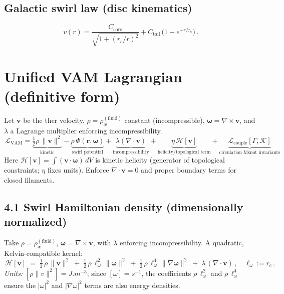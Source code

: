 \documentclass[11pt,a4paper]{article}
\newcommand{\aeether}{\text{\ae}} %
\begin{document}
    \subsection{Galactic swirl law (disc kinematics)}
    \[
        \boxed{\, v(r) = \frac{C_{\mathrm{core}}}{\sqrt{1 + (r_c/r)^2}} + C_{\mathrm{tail}}\,\big(1 - e^{-r/r_c}\big) \,}.
    \]

    \section{Unified VAM Lagrangian (definitive form)}
    Let $\bm v$ be the \aeether{}ther velocity, $\rho=\rho_{\aeether}^{(\mathrm{fluid})}$ constant (incompressible), $\bm\omega=\nabla\times\bm v$, and $\lambda$ a Lagrange multiplier enforcing incompressibility.
    \[
        \boxed{\, \mathcal{L}_{\mathrm{VAM}} =
            \underbrace{\tfrac{1}{2}\rho\,\lVert\bm v\rVert^{2}}_{\text{kinetic}}
            - \underbrace{\rho\,\Phi(\bm r,\bm\omega)}_{\text{swirl potential}}
            + \underbrace{\lambda(\nabla\!\cdot\!\bm v)}_{\text{incompressibility}}
            + \underbrace{\eta\,\mathcal{H}[\bm v]}_{\text{helicity/topological term}}
            + \underbrace{\mathcal{L}_{\mathrm{couple}}[\Gamma,\mathcal{K}]}_{\text{circulation \& knot invariants}} \, }.
    \]
    Here $\mathcal{H}[\bm v] = \int (\bm v\cdot\bm\omega)\,dV$ is kinetic helicity (generator of topological constraints; $\eta$ fixes units). Enforce $\nabla\cdot\bm v=0$ and proper boundary terms for closed filaments.

    \subsection*{4.1 Swirl Hamiltonian density (dimensionally normalized)}
    Take $\rho=\rho_{\aeether}^{(\mathrm{fluid})}$, $\bm\omega=\nabla\times\bm v$, with $\lambda$ enforcing incompressibility. A quadratic, Kelvin-compatible kernel:
    \[
        \boxed{\, \mathcal H[\bm v] \;=\; \tfrac12\,\rho\,\lVert\bm v\rVert^2 \;+\; \tfrac12\,\rho\,\ell_\omega^{2}\,\lVert\bm\omega\rVert^{2} \;+\; \tfrac12\,\rho\,\ell_\omega^{4}\,\lVert\nabla\bm\omega\rVert^{2} \;+\; \lambda\,(\nabla\!\cdot\!\bm v) \,},\quad \ell_\omega:=r_c\,.
    \]
    \noindent\textit{Units:} $[\rho\lVert v\rVert^2]=\si{J.m^{-3}}$; since $[\omega]=\si{s^{-1}}$, the coefficients $\rho\,\ell_\omega^{2}$ and $\rho\,\ell_\omega^{4}$ ensure the $|\omega|^{2}$ and $|\nabla\omega|^{2}$ terms are also energy densities.
\end{document}
